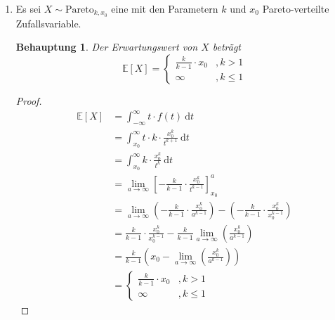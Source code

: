 \documentclass[a4paper]{scrartcl}
\newtheorem*{behaupt}{Behauptung}
\newcommand{\dif}{\ \mathrm{d}}
\newcommand{\e}{\mathbb{E}}
\def \blattnr {11}
\begin{document}
\begin{enumerate}[label=\bfseries \blattnr.\arabic*]
\begin{enumerate}
            \item
                Es sei $X \sim \mathrm{Pareto}_{k,x_0}$ eine mit den Parametern
                $k$ und $x_0$ Pareto-verteilte Zufallsvariable.
                \begin{behaupt}
                    Der Erwartungswert von $X$ beträgt
                    \begin{equation*}
                        \e[X] = \begin{cases}
				  \frac{k}{k-1} \cdot x_0 &, k>1 \\
				 \infty &, k\leq 1
				\end{cases}
                    \end{equation*}
                \end{behaupt}
                \begin{proof}
                    \begin{equation*}
                        \begin{split}
                            \e[X]
                            &= \int_{-\infty}^\infty t \cdot f(t) \dif t \\
                            &= \int_{x_0}^\infty t \cdot k \cdot \frac{x_0^k}{t^{k+1}} \dif t \\
                            &= \int_{x_0}^\infty k \cdot \frac{x_0^k}{t^k} \dif t \\
                            &= \lim_{a \to \infty} \left[ -\frac{k}{k-1} \cdot \frac{x_0^k}{t^{k-1}} \right]_{x_0}^a \\
                            &= \lim_{a \to \infty} \left( -\frac{k}{k-1} \cdot \frac{x_0^k}{a^{k-1}} \right) - \left( -\frac{k}{k-1} \cdot \frac{x_0^k}{x_0^{k-1}} \right) \\
                            &= \frac{k}{k-1} \cdot \frac{x_0^k}{x_0^{k-1}} -\frac{k}{k-1} \lim_{a \to \infty} \left(\frac{x_0^k}{a^{k-1}} \right) \\    
                            &= \frac{k}{k-1} \left(x_0 -\lim_{a \to \infty} \left(\frac{x_0^k}{a^{k-1}} \right)\right) \\    
			    &= \begin{cases}
				  \frac{k}{k-1} \cdot x_0 &, k>1 \\
				 \infty &, k\leq 1
				\end{cases}
                        \end{split}
                    \end{equation*}
                \end{proof}

        \end{enumerate}
\end{enumerate}
\end{document}
